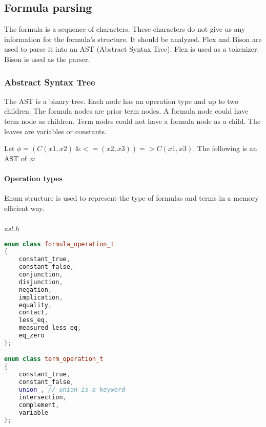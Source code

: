 \documentclass{article}
\begin{document}
	\subsection{Formula parsing}
	The formula is a sequence of characters. These characters do not give us any information for the formula's structure. It should be analyzed. Flex \cite{flex-tokenizer} and Bison \cite{bison-parser} are used to parse it into an AST (Abstract Syntax Tree). Flex is used as a tokenizer. Bison is used as the parser.

	\subsubsection{Abstract Syntax Tree}
	The AST is a binary tree. Each node has an operation type and up to two children. The formula nodes are prior term nodes. A formula node could have term node as children. Term nodes could not have a formula node as a child. The leaves are variables or constants.
	
	Let $\phi = (C(x1,x2) \;\& <=(x2, x3)) => C(x1, x3)$. The following is an AST of $\phi$:


	\newpage
	\paragraph{Operation types} Enum structure is used to represent the type of formulas and terms in a memory efficient way.
	\\
	\\
\noindent
\textit{ast.h}
	\begin{lstlisting}[language=C++]
enum class formula_operation_t
{
    constant_true,
    constant_false,
    conjunction,
    disjunction,
    negation,
    implication,
    equality,
    contact,
    less_eq,
    measured_less_eq,
    eq_zero
};

enum class term_operation_t
{
    constant_true,
    constant_false,
    union_, // union is a keyword
    intersection,
    complement,
    variable
};
	\end{lstlisting}
\end{document}

